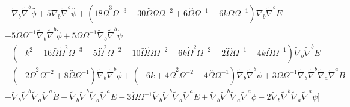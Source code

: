 \documentclass[10pt,letterpaper]{article}
\numberwithin{equation}{section}
\begin{document}
\begin{eqnarray}
&& -  \tilde{\nabla}_{b}\tilde{\nabla}^{b}\overset{..}{\phi} + 5 \tilde{\nabla}_{b}\tilde{\nabla}^{b}\overset{..}{\psi} + (18 \dot{\Omega}^3 \Omega^{-3} - 30 \overset{..}{\Omega} \dot{\Omega} \Omega^{-2} + 6 \overset{...}{\Omega} \Omega^{-1} - 6 k \dot{\Omega} \Omega^{-1}) \tilde{\nabla}_{b}\tilde{\nabla}^{b}\dot{E} \nonumber \\ 
&& + 5 \dot{\Omega} \Omega^{-1} \tilde{\nabla}_{b}\tilde{\nabla}^{b}\dot{\phi} + 5 \dot{\Omega} \Omega^{-1} \tilde{\nabla}_{b}\tilde{\nabla}^{b}\dot{\psi} \nonumber \\ 
&& + (- k^2 + 16 \overset{..}{\Omega} \dot{\Omega}^2 \Omega^{-3} - 5 \overset{..}{\Omega}^2 \Omega^{-2} - 10 \overset{...}{\Omega} \dot{\Omega} \Omega^{-2} + 6 k \dot{\Omega}^2 \Omega^{-2} + 2 \overset{....}{\Omega} \Omega^{-1} - 4 k \overset{..}{\Omega} \Omega^{-1}) \tilde{\nabla}_{b}\tilde{\nabla}^{b}E \nonumber \\ 
&& + (-2 \dot{\Omega}^2 \Omega^{-2} + 8 \overset{..}{\Omega} \Omega^{-1}) \tilde{\nabla}_{b}\tilde{\nabla}^{b}\phi + (-6 k + 4 \dot{\Omega}^2 \Omega^{-2} - 4 \overset{..}{\Omega} \Omega^{-1}) \tilde{\nabla}_{b}\tilde{\nabla}^{b}\psi + 3 \dot{\Omega} \Omega^{-1} \tilde{\nabla}_{b}\tilde{\nabla}^{b}\tilde{\nabla}_{a}\tilde{\nabla}^{a}B \nonumber \\ 
&& + \tilde{\nabla}_{b}\tilde{\nabla}^{b}\tilde{\nabla}_{a}\tilde{\nabla}^{a}\dot{B} -  \tilde{\nabla}_{b}\tilde{\nabla}^{b}\tilde{\nabla}_{a}\tilde{\nabla}^{a}\overset{..}{E} - 3 \dot{\Omega} \Omega^{-1} \tilde{\nabla}_{b}\tilde{\nabla}^{b}\tilde{\nabla}_{a}\tilde{\nabla}^{a}\dot{E} + \tilde{\nabla}_{b}\tilde{\nabla}^{b}\tilde{\nabla}_{a}\tilde{\nabla}^{a}\phi - 2 \tilde{\nabla}_{b}\tilde{\nabla}^{b}\tilde{\nabla}_{a}\tilde{\nabla}^{a}\psi \Bigg]
\end{eqnarray}
\end{document}
